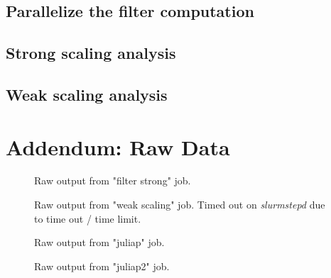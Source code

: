 \documentclass[a4paper,%
7pt,%
DIV12,
headsepline,%
headings=normal,
]{scrartcl}
\begin{document}
\subsection{Parallelize the filter computation}

\subsection{Strong scaling analysis}

\subsection{Weak scaling analysis}

\newpage

\section{Addendum: Raw Data}

\begin{figure}[htbp]
    \centering
    \label{tab:filter_strong}
    \caption{Raw output from "filter strong" job.}
\end{figure}

\begin{figure}[htbp]
    \centering
    \label{tab:filter_weak}
    \caption{Raw output from "weak scaling" job. Timed out on \textit{slurmstepd} due to time out / time limit.}
\end{figure}

\begin{figure}[htbp]
    \centering
    \label{tab:juliap}
    \caption{Raw output from "juliap" job.}
\end{figure}

\begin{figure}[htbp]
    \centering
    \label{tab:juliap2}
    \caption{Raw output from "juliap2" job.}
\end{figure}
\end{document}
